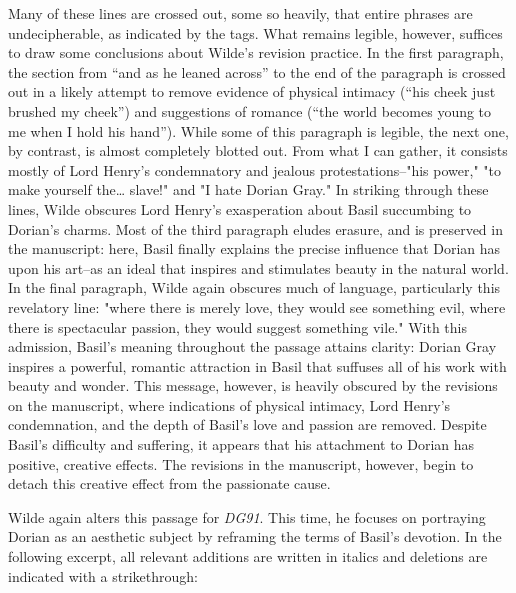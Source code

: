 \documentclass[11pt]{article}
\begin{document}
Many of these lines are crossed out, some so heavily, that entire
phrases are undecipherable, as indicated by the tags. What remains
legible, however, suffices to draw some conclusions about Wilde’s
revision practice. In the first paragraph, the section from “and as he
leaned across” to the end of the paragraph is crossed out in a likely
attempt to remove evidence of physical intimacy (“his cheek just
brushed my cheek”) and suggestions of romance (“the world becomes
young to me when I hold his hand”). While some of this paragraph is
legible, the next one, by contrast, is almost completely blotted
out. From what I can gather, it consists mostly of Lord Henry’s
condemnatory and jealous protestations--"his power," "to make yourself
the\ldots{} slave!" and "I hate Dorian Gray." In striking through these
lines, Wilde obscures Lord Henry’s exasperation about Basil succumbing
to Dorian’s charms. Most of the third paragraph eludes erasure, and is
preserved in the manuscript: here, Basil finally explains the precise
influence that Dorian has upon his art--as an ideal that inspires and
stimulates beauty in the natural world. In the final paragraph, Wilde
again obscures much of language, particularly this revelatory line:
"where there is merely love, they would see something evil, where
there is spectacular passion, they would suggest something vile." With
this admission, Basil’s meaning throughout the passage attains
clarity: Dorian Gray inspires a powerful, romantic attraction in Basil
that suffuses all of his work with beauty and wonder. This message,
however, is heavily obscured by the revisions on the manuscript, where
indications of physical intimacy, Lord Henry’s condemnation, and the
depth of Basil’s love and passion are removed. Despite Basil’s
difficulty and suffering, it appears that his attachment to Dorian has
positive, creative effects. The revisions in the manuscript, however,
begin to detach this creative effect from the passionate cause. 

Wilde again alters this passage for \emph{DG91}. This time, he focuses on
portraying Dorian as an aesthetic subject by reframing the terms of
Basil’s devotion. In the following excerpt, all relevant additions are
written in italics and deletions are indicated with a strikethrough:
\end{document}
